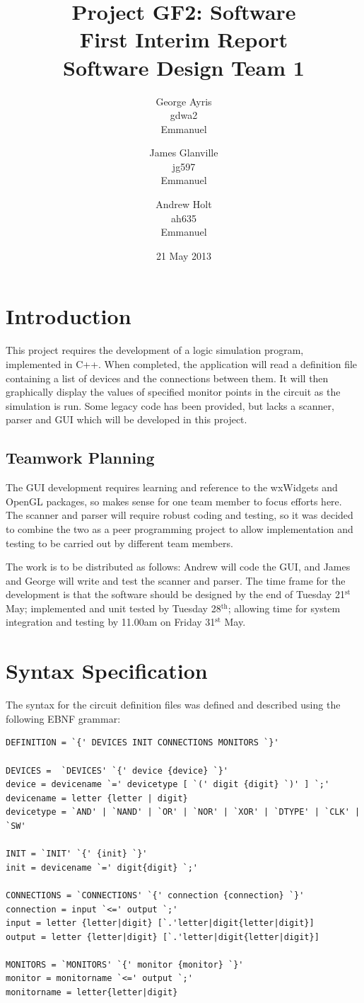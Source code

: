 \documentclass[a4paper,11pt]{article}  %
\title{Project GF2: Software\\ First Interim Report\\ Software Design
  Team 1}
\author{George Ayris\\ gdwa2\\ Emmanuel \and James Glanville\\
jg597\\ Emmanuel \and Andrew Holt\\ ah635\\ Emmanuel}
\date{21 May 2013}
\begin{document}
\maketitle

\section{Introduction}

This project requires the development of a logic simulation program,
implemented in C++. When completed, the application will read a
definition file containing a list of devices and the connections
between them. It will then graphically display the values of specified
monitor points in the circuit as the simulation is run. Some legacy
code has been provided, but lacks a scanner, parser and GUI which will
be developed in this project.

\subsection{Teamwork Planning}

The GUI development requires learning and reference to the wxWidgets
and OpenGL packages, so makes sense for one team member to focus
efforts here. The scanner and parser will require robust coding and
testing, so it was decided to combine the two as a peer programming
project to allow implementation and testing to be carried out by
different team members.

The work is to be distributed as follows: Andrew will code the GUI,
and James and George will write and test the scanner and parser. The
time frame for the development is that the software should be designed
by the end of Tuesday 21$^{\mathrm{st}}$ May; implemented and unit
tested by Tuesday 28$^{\mathrm{th}}$; allowing time for system
integration and testing by 11.00am on Friday 31$^{\mathrm{st}}$ May.

\section{Syntax Specification}

The syntax for the circuit definition files was defined and described
using the following EBNF grammar:
\begin{lstlisting}
DEFINITION = `{' DEVICES INIT CONNECTIONS MONITORS `}'

DEVICES =  `DEVICES' `{' device {device} `}'
device = devicename `=' devicetype [ `(' digit {digit} `)' ] `;'
devicename = letter {letter | digit}
devicetype = `AND' | `NAND' | `OR' | `NOR' | `XOR' | `DTYPE' | `CLK' | `SW'

INIT = `INIT' `{' {init} `}'
init = devicename `=' digit{digit} `;'

CONNECTIONS = `CONNECTIONS' `{' connection {connection} `}'
connection = input `<=' output `;'
input = letter {letter|digit} [`.'letter|digit{letter|digit}]
output = letter {letter|digit} [`.'letter|digit{letter|digit}]

MONITORS = `MONITORS' `{' monitor {monitor} `}'
monitor = monitorname `<=' output `;'
monitorname = letter{letter|digit}
\end{lstlisting}
\end{document}
